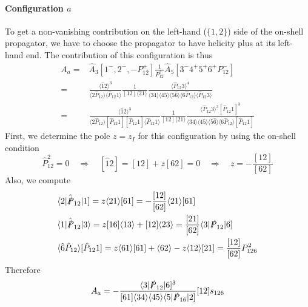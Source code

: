 \paragraph{Configuration $a$}
To get a non-vanishing contribution on the left-hand ($\{1,2\}$) side of the on-shell propagator, we have to choose the propagator to have helicity plus at its left-hand end.
The contribution of this configuration is thus  
\begin{equation*}
\begin{split}
A_a = & \hat{A}_3[1^-,2^-, -P_{12}^+]\frac{1}{P_{12}^2}\hat{A}_5[3^-4^+5^+6^+ P_{12}^-]
\\
= &\frac{\langle \hat{1}2\rangle^3}{\langle 2\hat{P}_{12}\rangle\langle \hat{P}_{12} 1\rangle}
\frac{1}{[12]\langle 21\rangle}
\frac{\langle \hat{P}_{12} 3\rangle^4}{\langle 34\rangle\langle 45\rangle\langle 5\hat{6}\rangle\langle 6\hat{P}_{12}\rangle\langle \hat{P}_{12} 3\rangle}
\\
=&
\frac{\langle \hat{1}2\rangle^3}{\langle 2\hat{P}_{12}\rangle[\hat{P}_{12} 1][\hat{P}_{12} 1]\langle \hat{P}_{12} 1\rangle}
\frac{1}{[12]\langle 21\rangle}
\frac{\langle \hat{P}_{12} 3\rangle^3[\hat{P}_{12} 1]^3}{\langle 34\rangle\langle 45\rangle\langle 5\hat{6}\rangle\langle 6\hat{P}_{12}\rangle[\hat{P}_{12} 1]}
\end{split}
\end{equation*}
First, we determine the pole $z=z_I$ for this configuration by using the on-shell condition 
\begin{equation*}
\hat{P}_{12}^2 = 0
\quad\Rightarrow\quad
[\hat{1}2] =  [12] + z[62] = 0
\quad\Rightarrow\quad
z= -\frac{[12]}{[62]}
\end{equation*}
Also, we compute
\begin{equation*}
\begin{split}
& \langle 2 |\hat{\slashed{P}}_{12}|1] = z\langle 21\rangle[61] = -\frac{[12]}{[62]}\langle 21 \rangle[61]
\\
&
\langle 1 |\hat{\slashed{P}}_{12}|3\rangle = 
z[16]\langle 13 \rangle + [12]\langle 23 \rangle
=\frac{[21]}{[62]}\langle 3 |\slashed{P}_{12}|6]
\\
&
\langle \hat{6}\hat{P}_{12}\rangle[\hat{P}_{12}1] = z\langle 61 \rangle[61] + \langle 62\rangle - z\langle 12\rangle[21]
=
\frac{[12]}{[62]}P_{126}^2
\end{split}
\end{equation*}
Therefore
\begin{equation}\label{a6a}
A_a = -\frac{\langle 3 |\slashed{P}_{12}|6]^3}{[61]\langle 34\rangle \langle 45\rangle\langle 5|\slashed{P}_{16}|2]}[12]s_{126}
\end{equation}
%
%
